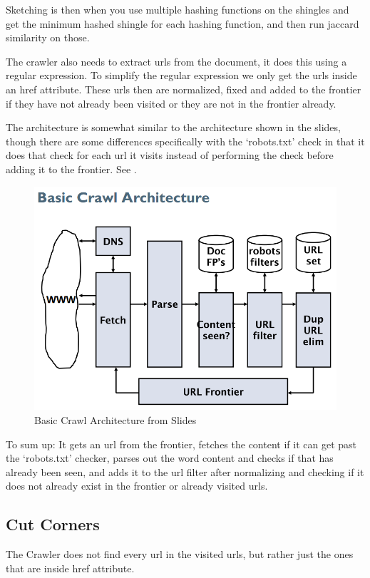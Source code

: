 	Sketching is then when you use multiple hashing functions on the shingles and get the minimum hashed shingle for each hashing function, and then run jaccard similarity on those.
	
	The crawler also needs to extract urls from the document, it does this using a regular expression. To simplify the regular expression we only get the urls inside an href attribute. These urls then are normalized, fixed and added to the frontier if they have not already been visited or they are not in the frontier already.
	
	The architecture is somewhat similar to the architecture shown in the slides, though there are some differences specifically with the `robots.txt' check in that it does that check for each url it visits instead of performing the check before adding it to the frontier. See .
	
	\begin{figure}[H]
	\centering
	\includegraphics[width=0.7\linewidth]{./Media/basiccrawlarchitecture}
	\caption{Basic Crawl Architecture from Slides}
	\label{fig:basiccrawlarchitecture}
	\end{figure}
	
	To sum up: It gets an url from the frontier, fetches the content if it can get past the `robots.txt' checker, parses out the word content and checks if that has already been seen, and adds it to the url filter after normalizing and checking if it does not already exist in the frontier or already visited urls.
	
	\subsection{Cut Corners}
	The Crawler does not find every url in the visited urls, but rather just the ones that are inside href attribute.
	
